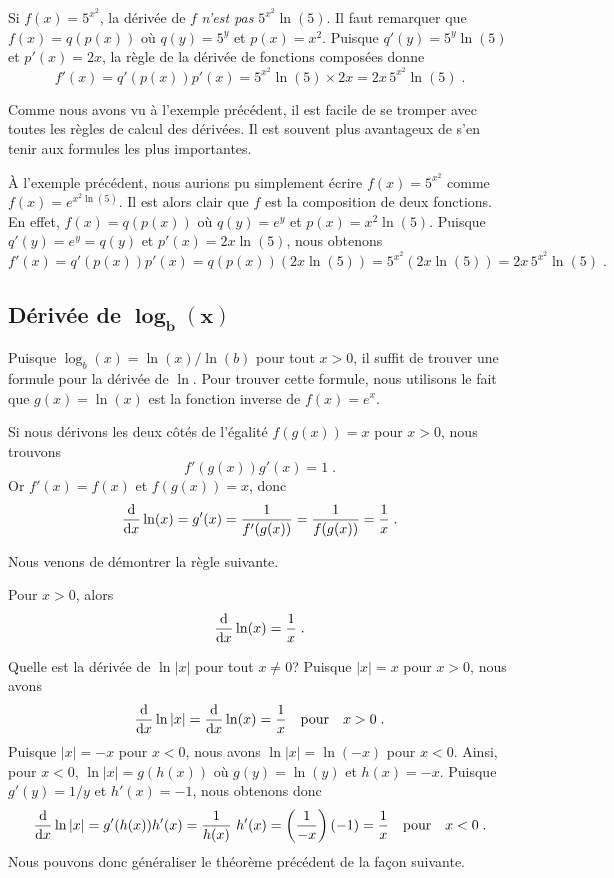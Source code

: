{\begin{egg}
Si $f(x) = 5^{x^2}$, la dérivée de $f$ {\em n'est pas}
$5^{x^2}\ln(5)$.  Il faut remarquer que $f(x) = q(p(x))$ où
$q(y) = 5^y$ et $p(x)=x^2$.  Puisque $q'(y) = 5^y \ln(5)$ et $p'(x) = 2 x$,
la règle de la dérivée de fonctions composées donne
\[
f'(x) = q'(p(x)) p'(x) = 5^{x^2}\ln(5) \times 2x 
= 2x\, 5^{x^2} \ln(5)\; .
\]
\end{egg}

\begin{rmk}
Comme nous avons vu à l'exemple précédent, il est facile de se tromper avec
toutes les règles de calcul des dérivées.  Il est souvent plus
avantageux de s'en tenir aux formules les plus importantes.

À l'exemple précédent, nous aurions pu simplement écrire $f(x) = 5^{x^2}$
comme $f(x) = e^{x^2\ln(5)}$.  Il est alors clair que $f$ est la
composition de deux fonctions.  En effet, $f(x) = q(p(x))$ où $q(y) = e^y$
et $p(x) = x^2 \ln(5)$.  Puisque $q'(y) = e^y = q(y)$ et $p'(x) = 2x \ln(5)$,
nous obtenons
\[
f'(x) = q'(p(x))p'(x) = q({p(x)}) ( 2x \ln(5) )
= 5^{x^2} (2x \ln(5)) = 2x\, 5^{x^2}\ln(5) \; .
\]
\end{rmk}

\subsection{Dérivée de $\mathbf{\log_b(x)}$}

Puisque $\log_b(x) = \ln(x) / \ln(b)$ pour tout $x>0$, il suffit de
trouver une formule pour la dérivée de $\ln$.  Pour trouver cette
formule, nous utilisons le fait que $g(x)=\ln(x)$ est la fonction inverse
de $f(x) = e^x$.

Si nous dérivons les deux côtés de l'égalité $f(g(x))= x$ pour $x>0$,
nous trouvons
\[
f'(g(x))g'(x) = 1 \; .
\]
Or $f'(x) = f(x)$ et $f(g(x))=x$, donc
\[
\dfdx{\ln(x)}{x} = g'(x) = \frac{1}{f'(g(x))}
= \frac{1}{f(g(x))} = \frac{1}{x} \; .
\]

Nous venons de démontrer la règle suivante.

\begin{prop}
Pour $x>0$, alors
\[
\dfdx{\ln(x)}{x} = \frac{1}{x} \; .
\]
\end{prop}

Quelle est la dérivée de $\ln |x|$ pour tout $x \neq 0$?  Puisque
$|x|=x$ pour $x>0$, nous avons
\[
\dfdx{\ln|x|}{x} = \dfdx{\ln(x)}{x} = \frac{1}{x} \quad \text{pour}
\quad x>0 \;.
\]
Puisque $|x|=-x$ pour $x<0$, nous avons $\ln|x| = \ln(-x)$ pour $x<0$.
Ainsi, pour $x<0$, $\ln|x| = g(h(x))$ où $g(y) = \ln(y)$ et
$h(x) = -x$.  Puisque $g'(y) = 1/y$ et $h'(x) = -1$, nous obtenons donc
\[
\dfdx{\ln|x|}{x} = g'(h(x)) h'(x) = \frac{1}{h(x)} \ h'(x) =
\left(\frac{1}{-x}\right) (-1) = \frac{1}{x} \quad \text{pour} \quad x< 0 \; .
\]
Nous pouvons donc généraliser le théorème précédent de la façon suivante.

}

